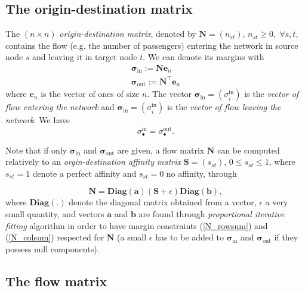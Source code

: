 \documentclass[11p]{article}
\begin{document}
\subsection{The origin-destination matrix}

The $(n \times n)$ \emph{origin-destination matrix}, denoted by $\mathbf{N} = (n_{st})$, $n_{st} \geq 0, \; \forall s,t$, contains the flow (e.g. the number of passengers) entering the network in source node $s$ and leaving it in target node $t$. We can denote its margins with 
\begin{align}
\bm{\sigma}_\text{in} := \mathbf{N} \mathbf{e}_n \label{N_rowsum}\\
\bm{\sigma}_\text{out} := \mathbf{N}^\top \mathbf{e}_n \label{N_colsum}
\end{align}
where $\mathbf{e}_n$ is the vector of ones of size $n$. The vector $\bm{\sigma}_\text{in} = (\sigma^\text{in}_i)$ is the \emph{vector of flow entering the network} and $\bm{\sigma}_\text{in} = (\sigma^\text{in}_i)$ is the \emph{vector of flow leaving the network}. We have
\begin{equation}
\sigma^\text{in}_{\bullet} = \sigma^\text{out}_{\bullet}.
\end{equation}

Note that if only $\bm{\sigma}_\text{in}$ and $\bm{\sigma}_\text{out}$ are given, a flow matrix $\mathbf{N}$ can be computed relatively to an \emph{orgin-destination affinity matrix} $\mathbf{S} = (s_{st})$, $0 \leq s_{st} \leq 1$, where $s_{st} = 1$ denote a perfect affinity and $s_{st} = 0$ no affinity, through

\begin{equation}
\mathbf{N} = \textbf{Diag}(\mathbf{a}) (\mathbf{S} + \epsilon) \textbf{Diag}(\mathbf{b}),
\end{equation}
where $\textbf{Diag}(.)$ denote the diagonal matrix obtained from a vector, $\epsilon$ a very small quantity, and vectors $\mathbf{a}$ and $\mathbf{b}$ are found through \emph{proportional iterative fitting} algorithm in order to have margin constraints (\ref{N_rowsum}) and (\ref{N_colsum}) respected for $\mathbf{N}$ (a small $\epsilon$ has to be added to $\bm{\sigma}_\text{in}$ and $\bm{\sigma}_\text{out}$ if they possess null components).


\subsection{The flow matrix}
\end{document}
